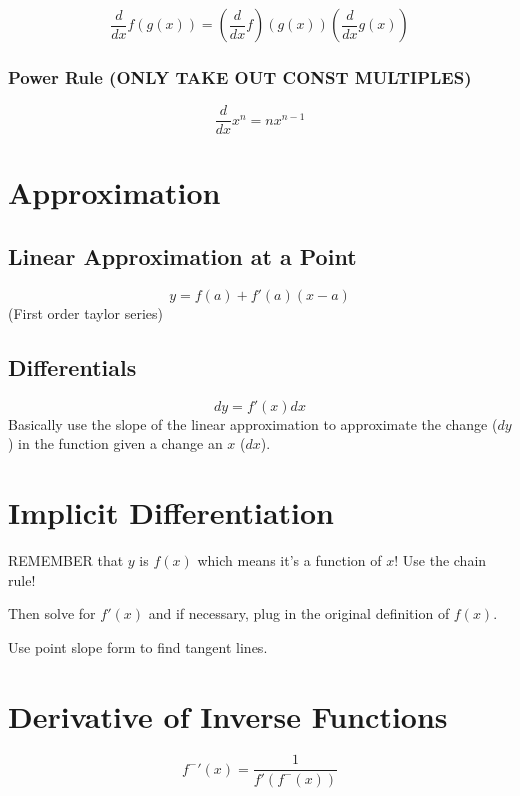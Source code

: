 \documentclass[letterpaper]{article}
\begin{document}
\[ \frac{d}{dx} f(g(x)) = \left(\frac{d}{dx} f\right)(g(x))\left(\frac{d}{dx} g(x)\right) \]
\subsubsection{Power Rule (ONLY TAKE OUT CONST MULTIPLES)}
\label{sec:orge8ea21d}
\[ \frac{d}{dx} x^n = nx^{n-1} \]

\section{Approximation}
\label{sec:orgc51dfcb}
\subsection{Linear Approximation at a Point}
\label{sec:org19b56cc}
\[ y = f(a) + f'(a)(x-a) \]
(First order taylor series)
\subsection{Differentials}
\label{sec:orga1dc070}
\[ dy = f'(x)dx \]
Basically use the slope of the linear approximation to approximate the change (\(dy\)) in the function given a change an \(x\) (\(dx\)).

\section{Implicit Differentiation}
\label{sec:org6b74470}

REMEMBER that \(y\) is \(f(x)\) which means it's a function of \(x\)! Use the chain rule!

Then solve for \(f'(x)\) and if necessary, plug in the original definition of \(f(x)\).

Use point slope form to find tangent lines.

\section{Derivative of Inverse Functions}
\label{sec:org0432fe8}

\[ f^{-}'(x) = \frac{1}{f'\left(f^-(x)\right)} \]
\end{document}
